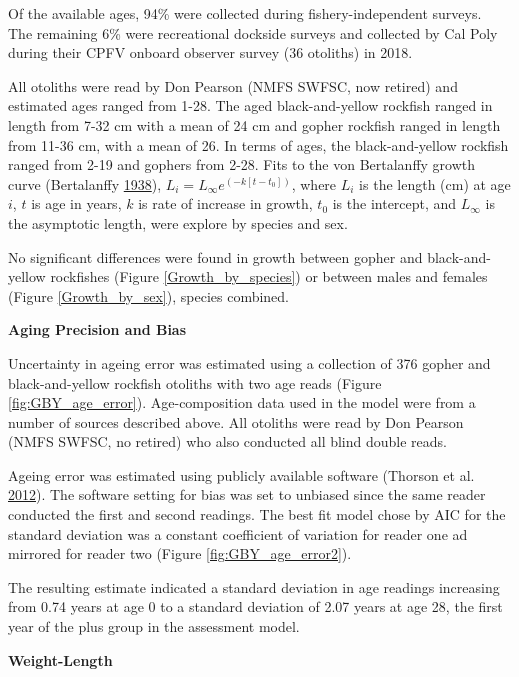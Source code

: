 \documentclass[12pt,]{article}
\begin{document}
Of the available ages, 94\% were collected during fishery-independent
surveys.\\
The remaining 6\% were recreational dockside surveys and collected by
Cal Poly during their CPFV onboard observer survey (36 otoliths) in
2018.

All otoliths were read by Don Pearson (NMFS SWFSC, now retired) and
estimated ages ranged from 1-28. The aged black-and-yellow rockfish
ranged in length from 7-32 cm with a mean of 24 cm and gopher rockfish
ranged in length from 11-36 cm, with a mean of 26. In terms of ages, the
black-and-yellow rockfish ranged from 2-19 and gophers from 2-28. Fits
to the von Bertalanffy growth curve (Bertalanffy
\protect\hyperlink{ref-vonB1938}{1938}),
\(L_i = L_{\infty}e^{(-k[t-t_0])}\), where \(L_i\) is the length (cm) at
age \(i\), \(t\) is age in years, \(k\) is rate of increase in growth,
\(t_0\) is the intercept, and \(L_{\infty}\) is the asymptotic length,
were explore by species and sex.

No significant differences were found in growth between gopher and
black-and-yellow rockfishes (Figure \ref{Growth_by_species}) or between
males and females (Figure \ref{Growth_by_sex}), species combined.

\vspace{.5cm} \textbf{Aging Precision and Bias}

Uncertainty in ageing error was estimated using a collection of 376
gopher and black-and-yellow rockfish otoliths with two age reads (Figure
\ref{fig:GBY_age_error}). Age-composition data used in the model were
from a number of sources described above. All otoliths were read by Don
Pearson (NMFS SWFSC, no retired) who also conducted all blind double
reads.

Ageing error was estimated using publicly available software (Thorson et
al. \protect\hyperlink{ref-Thorson2012}{2012}). The software setting for
bias was set to unbiased since the same reader conducted the first and
second readings. The best fit model chose by AIC for the standard
deviation was a constant coefficient of variation for reader one ad
mirrored for reader two (Figure \ref{fig:GBY_age_error2}).

The resulting estimate indicated a standard deviation in age readings
increasing from 0.74 years at age 0 to a standard deviation of 2.07
years at age 28, the first year of the plus group in the assessment
model.

\vspace{.5cm} \textbf{Weight-Length}
\end{document}
